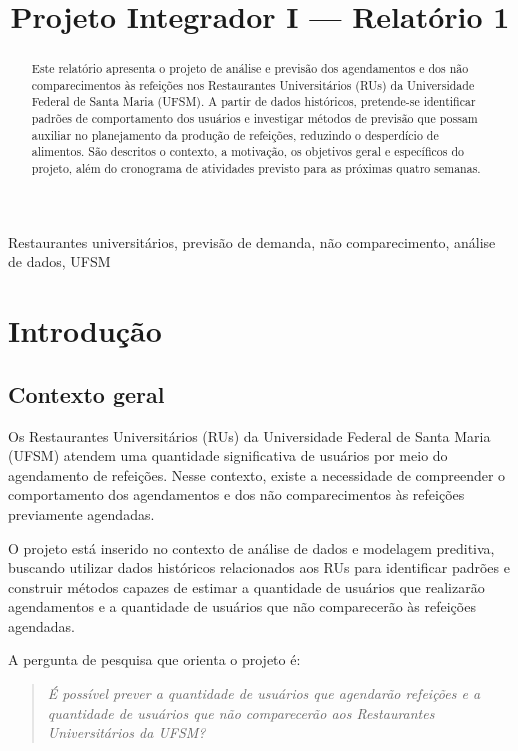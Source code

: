 \documentclass{article}
\title{Projeto Integrador I --- Relatório 1}
\begin{document}
\maketitle
%
\begin{abstract}
Este relatório apresenta o projeto de análise e previsão dos agendamentos e dos não comparecimentos às refeições nos Restaurantes Universitários (RUs) da Universidade Federal de Santa Maria (UFSM). A partir de dados históricos, pretende-se identificar padrões de comportamento dos usuários e investigar métodos de previsão que possam auxiliar no planejamento da produção de refeições, reduzindo o desperdício de alimentos. São descritos o contexto, a motivação, os objetivos geral e específicos do projeto, além do cronograma de atividades previsto para as próximas quatro semanas.
\end{abstract}
%
\begin{keywords}
Restaurantes universitários, previsão de demanda, não comparecimento, análise de dados, UFSM
\end{keywords}
%
\section{Introdução}
\label{sec:intro}

\subsection{Contexto geral}
\label{ssec:contexto}

Os Restaurantes Universitários (RUs) da Universidade Federal de Santa Maria (UFSM) atendem uma quantidade significativa de usuários por meio do agendamento de refeições. Nesse contexto, existe a necessidade de compreender o comportamento dos agendamentos e dos não comparecimentos às refeições previamente agendadas.

O projeto está inserido no contexto de análise de dados e modelagem preditiva, buscando utilizar dados históricos relacionados aos RUs para identificar padrões e construir métodos capazes de estimar a quantidade de usuários que realizarão agendamentos e a quantidade de usuários que não comparecerão às refeições agendadas.

A pergunta de pesquisa que orienta o projeto é:

\begin{quote}
\itshape
É possível prever a quantidade de usuários que agendarão refeições e a quantidade de usuários que não comparecerão aos Restaurantes Universitários da UFSM?
\end{quote}
\end{document}

